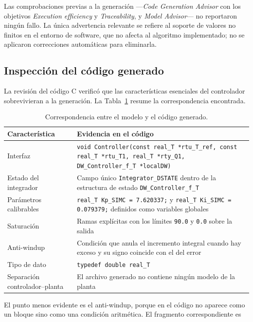 Las comprobaciones previas a la generación ---\emph{Code Generation Advisor} con los objetivos
\emph{Execution efficiency} y \emph{Traceability}, y \emph{Model Advisor}--- no reportaron ningún
fallo. La única advertencia relevante se refiere al soporte de valores no finitos en el entorno de
software, que no afecta al algoritmo implementado; no se aplicaron correcciones automáticas para
eliminarla.

\subsection{Inspección del código generado}

La revisión del código C verificó que las características esenciales del controlador sobrevivieran
a la generación. La Tabla~\ref{tab:codigo} resume la correspondencia encontrada.

\begin{table}[!t]
\caption{Correspondencia entre el modelo y el código generado.}
\label{tab:codigo}
\centering
\footnotesize
\begin{tabular}{@{}p{}p{}@{}}
\toprule
\textbf{Característica} & \textbf{Evidencia en el código} \\
\midrule
Interfaz &
\texttt{void Controller(const real\_T *rtu\_T\_ref, const real\_T *rtu\_T1, real\_T *rty\_Q1,
DW\_Controller\_f\_T *localDW)} \\
\addlinespace
Estado del integrador &
Campo único \texttt{Integrator\_DSTATE} dentro de la estructura de estado \texttt{DW\_Controller\_f\_T} \\
\addlinespace
Parámetros calibrables &
\texttt{real\_T Kp\_SIMC = 7.620337;} y \texttt{real\_T Ki\_SIMC = 0.079379;} definidos como
variables globales \\
\addlinespace
Saturación &
Ramas explícitas con los límites \texttt{90.0} y \texttt{0.0} sobre la salida \\
\addlinespace
Anti-windup &
Condición que anula el incremento integral cuando hay exceso y su signo coincide con el del error \\
\addlinespace
Tipo de dato &
\texttt{typedef double real\_T} \\
\addlinespace
Separación controlador--planta &
El archivo generado no contiene ningún modelo de la planta \\
\bottomrule
\end{tabular}
\end{table}

El punto menos evidente es el anti-windup, porque en el código no aparece como un bloque sino como
una condición aritmética. El fragmento correspondiente es

